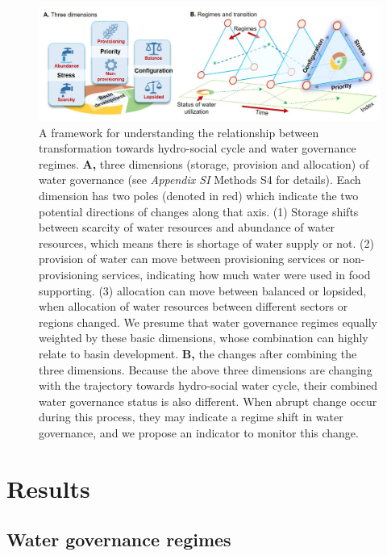 \documentclass[9pt, twocolumn, twoside, lineno]{pnas-new}
\begin{document}
\begin{figure}%
	\centering
	\includegraphics[width=0.8\linewidth]{../../figures/main/framework.jpg}
	\caption{
		A framework for understanding the relationship between transformation towards hydro-social cycle and water governance regimes.
		\textbf{A,} three dimensions (storage, provision and allocation) of water governance (see \textit{Appendix SI} Methods S4 for details). Each dimension has two poles (denoted in red) which indicate the two potential directions of changes along that axis. (1) Storage shifts between scarcity of water resources and abundance of water resources, which means there is shortage of water supply or not. (2) provision of water can move between provisioning services or non-provisioning services, indicating how much water were used in food supporting. (3) allocation can move between balanced or lopsided, when allocation of water resources between different sectors or regions changed. We presume that water governance regimes equally weighted by these basic dimensions, whose combination can highly relate to basin development. 
		\textbf{B,} the changes after combining the three dimensions. Because the above three dimensions are changing with the trajectory towards hydro-social water cycle, their combined water governance status is also different. When abrupt change occur during this process, they may indicate a regime shift in water governance, and we propose an indicator to monitor this change.
	}
	\label{fig:framework}
\end{figure}


\section*{Results}
\subsection*{Water governance regimes}
\end{document}
